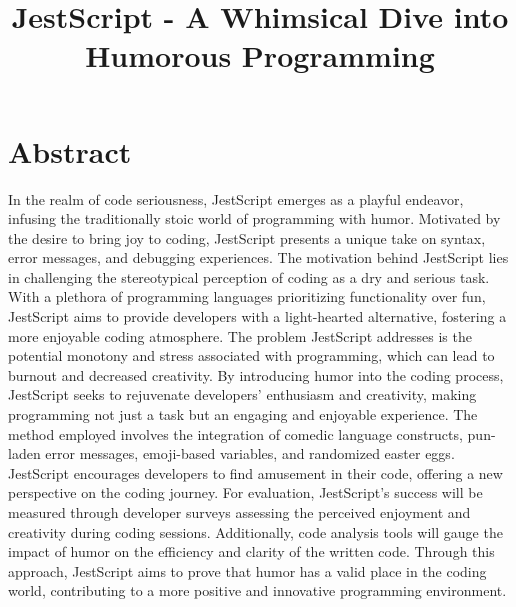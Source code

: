 \documentclass[11pt,onecolumn]{sjsucs-proposal}
\begin{document}
\title{JestScript - A Whimsical Dive into Humorous Programming}
\def\myname{Student Name}

\def\adv{Dr. Donald Knuth}
\def\advemail{sample@sjsu.edu}

\def\comone{Dr. Edsger W. Dijkstra}
\def\comoneemail{sample@sjsu.edu}

\def\comtwo{Dr. Claude Shannon}
\def\comtwoemail{sample@sjsu.edu}
\def\comtwoaffil{}

\def\semester{Fall 2023}

\maketitle


\section{Abstract}

In the realm of code seriousness, JestScript emerges as a playful endeavor, infusing the traditionally stoic world of programming with humor. Motivated by the desire to bring joy to coding, JestScript presents a unique take on syntax, error messages, and debugging experiences.
% 
The motivation behind JestScript lies in challenging the stereotypical perception of coding as a dry and serious task. With a plethora of programming languages prioritizing functionality over fun, JestScript aims to provide developers with a light-hearted alternative, fostering a more enjoyable coding atmosphere.
% 
The problem JestScript addresses is the potential monotony and stress associated with programming, which can lead to burnout and decreased creativity. By introducing humor into the coding process, JestScript seeks to rejuvenate developers' enthusiasm and creativity, making programming not just a task but an engaging and enjoyable experience.
% 
The method employed involves the integration of comedic language constructs, pun-laden error messages, emoji-based variables, and randomized easter eggs. JestScript encourages developers to find amusement in their code, offering a new perspective on the coding journey.
% 
For evaluation, JestScript's success will be measured through developer surveys assessing the perceived enjoyment and creativity during coding sessions. Additionally, code analysis tools will gauge the impact of humor on the efficiency and clarity of the written code. Through this approach, JestScript aims to prove that humor has a valid place in the coding world, contributing to a more positive and innovative programming environment.
\end{document}
